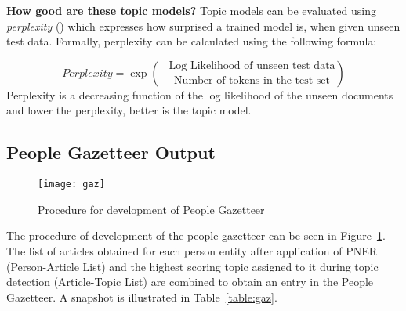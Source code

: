\noindent \textbf{How good are these topic models?}
Topic models can be evaluated using \emph{perplexity} (\cite{newman2009distributed, blei2003latent}) which expresses how surprised a trained model is, when given unseen test data. %
Formally, perplexity can be calculated using the following formula:

$$Perplexity= \exp(-\dfrac{\text{Log Likelihood of unseen test data}}{\text{Number of tokens in the test set}})$$
Perplexity is a decreasing function of the log likelihood of the unseen documents and lower the perplexity, better is the topic model.


\subsection{People Gazetteer Output }
\label{gaz:result}


\begin{figure}[h]
\centerline{\texttt{[image: gaz]}}
\caption{Procedure for development of People Gazetteer}
\label{figure:gaze}
\end{figure}


The procedure of development of the people gazetteer can be seen in Figure~\ref{figure:gaze}. The list of articles obtained for each person entity after application of PNER (Person-Article List) and the highest scoring topic assigned to it during topic detection (Article-Topic List) are combined to obtain an entry in the People Gazetteer. 
A snapshot is illustrated in Table~\ref{table:gaz}.

